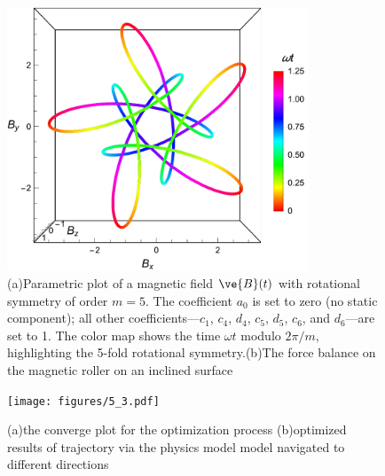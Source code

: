  
 \begin{figure}[p]
\centering
\includegraphics[width=9cm]{figures/5_2.pdf}
\caption{ (a)Parametric plot of a magnetic field $\ve{B}(t)$ with rotational symmetry of order $m=5$. The coefficient $a_0$ is set to zero (no static component); all other coefficients---$c_1$, $c_4$, $d_4$, $c_5$, $d_5$, $c_6$, and $d_6$---are set to 1. The color map shows the time $\omega t$ modulo $2\pi/m$, highlighting the 5-fold rotational symmetry.(b)The force balance on the magnetic roller on an inclined surface }
\label{fig:1}
\end{figure}
 
 \begin{figure}[p]
\centering
\texttt{[image: figures/5\_3.pdf]}
\caption{(a)the converge plot for the optimization process (b)optimized results of trajectory via the physics model model navigated to different directions   }
\label{fig:1}
\end{figure}
